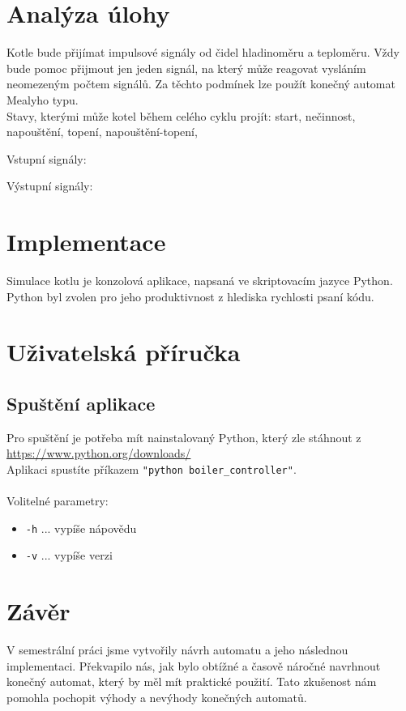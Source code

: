 \documentclass[12pt]{report}
\begin{document}
\chapter{Analýza úlohy}
Kotle bude přijímat impulsové signály od čidel hladinoměru a teploměru. Vždy bude pomoc přijmout jen jeden signál, na který může reagovat vysláním neomezeným počtem signálů.
Za těchto podmínek lze použít konečný automat Mealyho typu.\\
Stavy, kterými může kotel během celého cyklu projít: start, nečinnost, napouštění, topení, napouštění-topení,

Vstupní signály: 

Výstupní signály: 

\chapter{Implementace}
Simulace kotlu je konzolová aplikace, napsaná ve skriptovacím jazyce Python. Python byl zvolen pro jeho produktivnost z hlediska rychlosti psaní kódu.



\chapter{Uživatelská příručka}
\section{Spuštění aplikace}


Pro spuštění je potřeba mít nainstalovaný Python, který zle stáhnout z \url{https://www.python.org/downloads/}\\
Aplikaci spustíte příkazem \texttt{"python boiler\_controller"}.\\
\\
Volitelné parametry:
\begin{itemize}
	\item \texttt{-h} ... vypíše nápovědu
	\item \texttt{-v} ... vypíše verzi
\end{itemize}


\chapter{Závěr}
V semestrální práci jsme vytvořily návrh automatu a jeho následnou implementaci.
Překvapilo nás, jak bylo obtížné a časově náročné navrhnout konečný automat, který by měl mít praktické použití. Tato zkušenost nám pomohla pochopit výhody a nevýhody konečných automatů.
\end{document}
